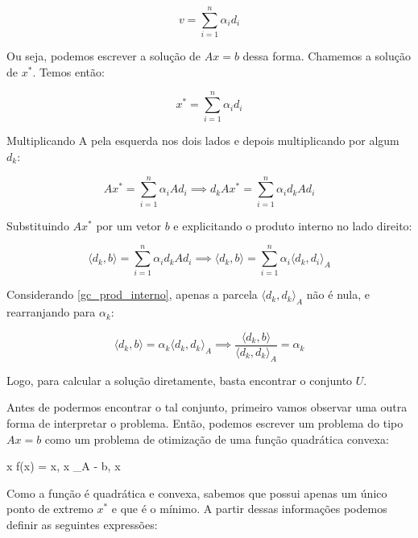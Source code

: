 \begin{equation}
v = \sum_{i=1}^n \alpha_i d_i
\end{equation}

Ou seja, podemos escrever a solução de \(Ax = b\) dessa forma. Chamemos a solução de
\(x^*\). Temos então:

\begin{equation}
x^* = \sum_{i=1}^n \alpha_i d_i
\end{equation}

Multiplicando A pela esquerda nos dois lados e depois multiplicando por algum \(d_k\):

\begin{equation}
Ax^* = \sum_{i=1}^n \alpha_i Ad_i \implies  d_k A x^* = \sum_{i=1}^n \alpha_i d_k A d_i
\end{equation}

Substituindo \(Ax^*\) por um vetor \(b\) e explicitando o produto interno no lado direito:

\begin{equation}
  \langle d_k, b \rangle = \sum_{i=1}^n \alpha_i d_k A d_i \implies \langle d_k, b \rangle = \sum_{i=1}^n \alpha_i \langle d_k ,d_i \rangle_A  
\end{equation}

Considerando \ref{gc_prod_interno}, apenas a parcela \( \langle d_k, d_k \rangle_A \) não é nula, e rearranjando para
\(\alpha_k\):

\begin{equation}
\langle d_k, b \rangle  = \alpha_k \langle d_k , d_k \rangle_A \implies \frac{\langle d_k, b \rangle}{\langle d_k , d_k \rangle_A} = \alpha_k
\end{equation}

Logo, para calcular a solução diretamente, basta encontrar o conjunto \(U\).

Antes de podermos encontrar o tal conjunto, primeiro vamos observar uma outra forma de
interpretar o problema. Então, podemos escrever um problema do tipo \(Ax = b\) como um
problema de otimização de uma função quadrática convexa:

\vspace{-15pt}
\begin{mini!}
{x}{ f(x) =  \langle x, x \rangle_A - \langle b, x \rangle \label{gcq_obj}}{\label{prob_gcq}}{}
\end{mini!}

Como a função é quadrática e convexa, sabemos que possui apenas um único ponto de
extremo \(x^*\) e que é o mínimo. A partir dessas informações podemos definir as
seguintes expressões:

